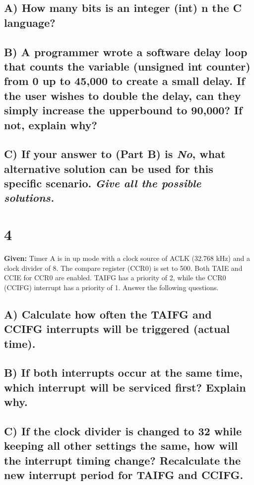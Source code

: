 \documentclass{article}
\begin{document}
\subsection{A) How many bits is an integer (int) n the C language?}

\subsection{B) A programmer wrote a software delay loop that counts the variable (unsigned int counter) from 0 up to 45,000 to create a small delay. If the user wishes to double the delay, can they simply increase the upperbound to 90,000? If not, explain why?}

\subsection{C) If your answer to (Part B) is \textit{No}, what alternative solution can be used for this specific scenario. \textit{Give all the possible solutions.}}

\section{4}
\textbf{Given:} Timer A is in up mode with a clock source of ACLK (32.768 kHz) and a clock divider of 8. The compare register (CCR0) is set to 500. Both TAIE and CCIE for CCR0 are enabled. TAIFG has a priority of 2, while the CCR0 (CCIFG) interrupt has a priority of 1. Answer the following questions.

\subsection{A) Calculate how often the TAIFG and CCIFG interrupts will be triggered (actual time).}

\subsection{B) If both interrupts occur at the same time, which interrupt will be serviced first? Explain why.}

\subsection{C) If the clock divider is changed to 32 while keeping all other settings the same, how will the interrupt timing change? Recalculate the new interrupt period for TAIFG and CCIFG.}
\end{document}
